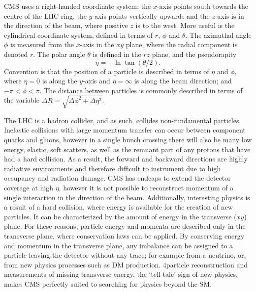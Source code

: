 \ac{CMS} uses a right-handed coordinate system; the $x$-axis points south towards the centre of the \ac{LHC} ring, the $y$-axis points vertically upwards and the $z$-axis is in the direction of the beam, where positive $z$ is to the west.
More useful is the cylindrical coordinate system, defined in terms of $r$, $\phi$ and $\theta$.
The azimuthal angle $\phi$ is measured from the $x$-axis in the $xy$ plane, where the radial component is denoted $r$. The polar angle $\theta$ is defined in the $rz$ plane, and the pseudorapity 
\begin{equation}
\eta = - \ln \tan (\theta /2).
\end{equation}
Convention is that the position of a particle is described in terms of $\eta$ and $\phi$, where $\eta = 0$ is along the $y$-axis and $\eta = \infty $ is along the beam direction; and $-\pi < \phi < \pi$. The distance between particles is commonly described in terms of the variable $\Delta R = \sqrt{\Delta\phi^2+\Delta\eta^2}$.

The \ac{LHC} is a hadron collider, and as such, collides non-fundamental particles. 
Inelastic collisions with large momentum transfer can occur between component quarks and gluons, however in a single bunch crossing there will also be many low energy, elastic, soft scatters, 
as well as the remnant part of any protons that have had a hard collision. 
As a result, the forward and backward directions are highly radiative environments and therefore difficult to instrument due to high occupancy and radiation damage. 
\ac{CMS} has endcaps to extend the detector coverage at high $\eta$, however it is not possible to reconstruct momentum of a single interaction in the direction of the beam.   
Additionally, interesting physics is a result of a hard collision, where energy is available for the creation of new particles. It can be characterized by the amount of energy in the transverse ($xy$) plane.
For these reasons, particle energy and momenta are described only in the transverse plane, where conservation laws can be applied.
By conserving energy and momentum in the transverse plane, any imbalance can be assigned to a particle leaving the detector without any trace; for example from a neutrino, or, from new physics processes such as \ac{DM} production.
4\pi particle reconstruction and measurements of missing transverse energy, the `tell-tale' sign of new physics, makes \ac{CMS} perfectly suited to searching for physics beyond the \ac{SM}.


